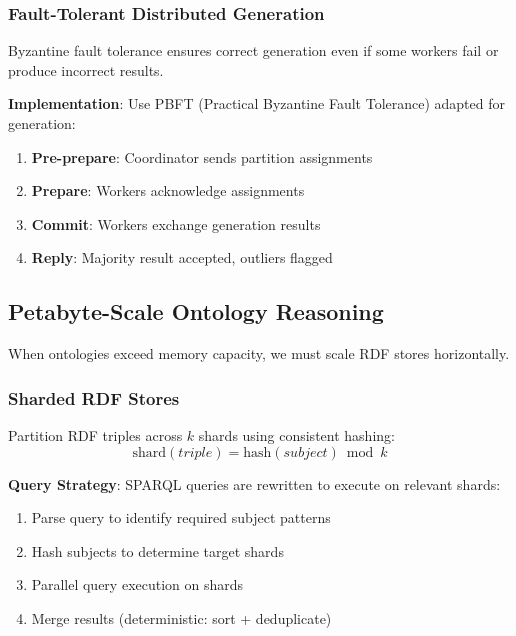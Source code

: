 \subsubsection{Fault-Tolerant Distributed Generation}

Byzantine fault tolerance ensures correct generation even if some workers fail or produce incorrect results.

\begin{theorem}[Byzantine Fault Tolerance for Generation]}
    With $3f+1$ workers and $f$ faulty workers, consensus protocol guarantees correct generation result.
\end{theorem}

\textbf{Implementation}: Use PBFT (Practical Byzantine Fault Tolerance) adapted for generation:
\begin{enumerate}
    \item \textbf{Pre-prepare}: Coordinator sends partition assignments
    \item \textbf{Prepare}: Workers acknowledge assignments
    \item \textbf{Commit}: Workers exchange generation results
    \item \textbf{Reply}: Majority result accepted, outliers flagged
\end{enumerate}

\subsection{Petabyte-Scale Ontology Reasoning}

When ontologies exceed memory capacity, we must scale RDF stores horizontally.

\subsubsection{Sharded RDF Stores}

\begin{definition}
    Partition RDF triples across $k$ shards using consistent hashing:
    \begin{equation}
        \text{shard}(triple) = \text{hash}(subject) \bmod k
    \end{equation}
\end{definition}

\textbf{Query Strategy}: SPARQL queries are rewritten to execute on relevant shards:
\begin{enumerate}
    \item Parse query to identify required subject patterns
    \item Hash subjects to determine target shards
    \item Parallel query execution on shards
    \item Merge results (deterministic: sort + deduplicate)
\end{enumerate}

